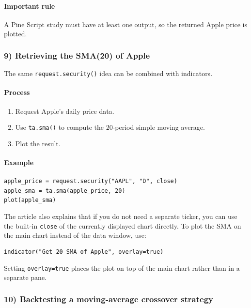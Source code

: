 \documentclass[12pt,openany]{book}
\begin{document}
\paragraph{Important rule}

A Pine Script study must have at least one output, so the returned Apple price is plotted.

\subsubsection{9) Retrieving the SMA(20) of Apple}

The same \texttt{request.security()} idea can be combined with indicators.

\paragraph{Process}

\begin{enumerate}[leftmargin=*]
    \item Request Apple's daily price data.
    \item Use \texttt{ta.sma()} to compute the 20-period simple moving average.
    \item Plot the result.
\end{enumerate}

\paragraph{Example}

\begin{Verbatim}[breaklines=true,breakanywhere=true,fontsize=\small]
apple_price = request.security("AAPL", "D", close)
apple_sma = ta.sma(apple_price, 20)
plot(apple_sma)
\end{Verbatim}

The article also explains that if you do not need a separate ticker, you can use the built-in \texttt{close} of the currently displayed chart directly. To plot the SMA on the main chart instead of the data window, use:

\begin{Verbatim}[breaklines=true,breakanywhere=true,fontsize=\small]
indicator("Get 20 SMA of Apple", overlay=true)
\end{Verbatim}

Setting \texttt{overlay=true} places the plot on top of the main chart rather than in a separate pane.

\subsubsection{10) Backtesting a moving-average crossover strategy}
\end{document}
